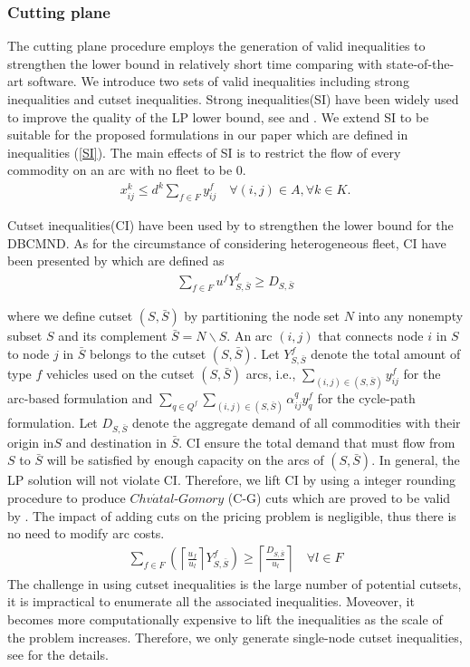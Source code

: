 \documentclass[11pt,nonblindrev,fleqn]{article}
\begin{document}
\subsubsection{Cutting plane}
The cutting plane procedure employs the generation of valid inequalities to strengthen the lower bound in relatively short time comparing with state-of-the-art software. We introduce two sets of valid inequalities including strong inequalities and cutset inequalities. Strong inequalities(SI) have been widely used to improve the quality of the LP lower bound, see \cite{Gendron1994RELAXATIONS,Gendron1999Multicommodity} and \cite{Chouman2015Cutting}. We extend SI to be suitable for the proposed formulations in our paper which are defined in inequalities (\ref{SI}). The main effects of SI is to restrict the flow of every commodity on an arc with no fleet to be 0.
\begin{align}\label{SI}
  x_{ij}^k \leq d^k \sum_{f\in F} y_{ij}^f      \quad       \forall (i,j)\in A, \forall k\in K.
\end{align}

Cutset inequalities(CI) have been used by \cite{Chouman2015Cutting} to strengthen the lower bound for the DBCMND. As for the circumstance of considering heterogeneous fleet, CI have been presented by \cite{Kim1999Multimodal} which are defined as
\begin{align}
    \sum_{f\in F}u^f Y_{S,\bar{S}}^f \geq  D_{S,\bar{S}}
\end{align}

where we define cutset $(S,\bar{S})$ by partitioning the node set $N$ into any nonempty subset $S$ and its complement $\bar{S}=N\backslash S$. An arc $(i,j)$ that connects node $i$ in $S$ to node $j$ in $\bar{S}$  belongs to the cutset $(S,\bar{S})$. Let $Y_{S,\bar{S}}^f$ denote the total amount of type $f$ vehicles used on the cutset $(S,\bar{S})$ arcs, i.e., $\sum_{(i,j)\in (S,\bar{S})} y_{ij}^f$ for the arc-based formulation and $\sum_{q\in Q^f}\sum_{(i,j)\in (S,\bar{S})} \alpha_{ij}^q y_q^f $ for the cycle-path formulation. Let $D_{S,\bar{S}}$ denote the aggregate demand of all commodities with their origin in$S$ and destination in $\bar{S}$. CI ensure the total demand that must flow from $S$ to $\bar{S}$ will be satisfied by enough capacity on the arcs of $(S,\bar{S})$. In general, the LP solution will not violate CI. Therefore, we lift CI by using a integer rounding procedure to produce $Chv\acute{a}tal$-$Gomory$ (C-G) cuts which are proved to be valid by \cite{Kim1999Multimodal}. The impact of adding cuts on the pricing problem is negligible, thus there is no need to modify arc costs.
\begin{align}
  \sum_{f\in F} \left( \left \lceil \frac{u_f}{u_l} \right \rceil Y_{S,\bar{S}}^f  \right)  \geq \left\lceil \frac{D_{S,\bar{S}}}{u_l} \right\rceil  \quad   \forall l\in F
\end{align}
The challenge in using cutset inequalities is the large number of potential cutsets, it is impractical to enumerate all the associated inequalities. Moveover, it becomes more computationally expensive to lift the inequalities as the scale of the problem increases. Therefore, we only generate single-node cutset inequalities, see \cite{Chouman2016Commodity} for the details.
\end{document}

